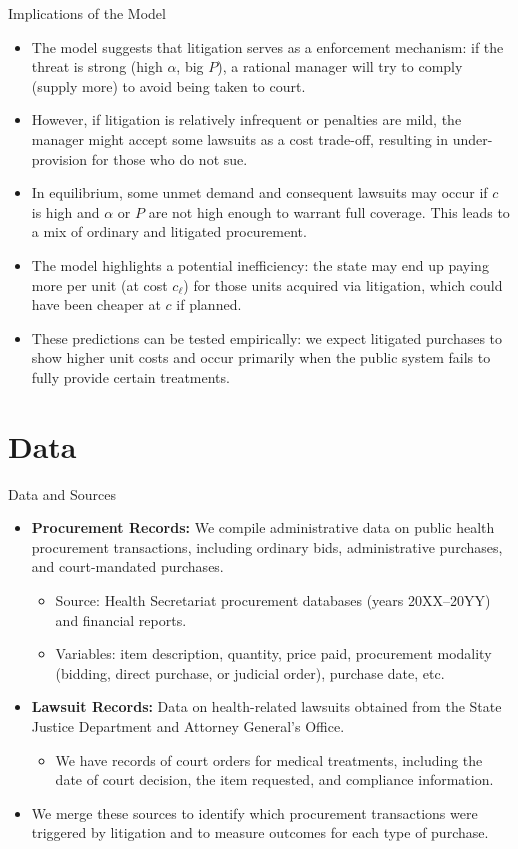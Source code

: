 \documentclass{beamer}
\begin{document}
\begin{frame}{Implications of the Model}
\begin{itemize}
  \item The model suggests that litigation serves as a enforcement mechanism: if the threat is strong (high $\alpha$, big $P$), a rational manager will try to comply (supply more) to avoid being taken to court.
  \item However, if litigation is relatively infrequent or penalties are mild, the manager might accept some lawsuits as a cost trade-off, resulting in under-provision for those who do not sue.
  \item In equilibrium, some unmet demand and consequent lawsuits may occur if $c$ is high and $\alpha$ or $P$ are not high enough to warrant full coverage. This leads to a mix of ordinary and litigated procurement.
  \item The model highlights a potential inefficiency: the state may end up paying more per unit (at cost $c_{\ell}$) for those units acquired via litigation, which could have been cheaper at $c$ if planned.
  \item These predictions can be tested empirically: we expect litigated purchases to show higher unit costs and occur primarily when the public system fails to fully provide certain treatments.
\end{itemize}
\end{frame}

\section{Data}

\begin{frame}{Data and Sources}
\begin{itemize}
  \item \textbf{Procurement Records:} We compile administrative data on public health procurement transactions, including ordinary bids, administrative purchases, and court-mandated purchases. 
  \begin{itemize}
    \item Source: Health Secretariat procurement databases (years 20XX--20YY) and financial reports.
    \item Variables: item description, quantity, price paid, procurement modality (bidding, direct purchase, or judicial order), purchase date, etc.
  \end{itemize}
  \item \textbf{Lawsuit Records:} Data on health-related lawsuits obtained from the State Justice Department and Attorney General’s Office.
  \begin{itemize}
    \item We have records of court orders for medical treatments, including the date of court decision, the item requested, and compliance information.
  \end{itemize}
  \item We merge these sources to identify which procurement transactions were triggered by litigation and to measure outcomes for each type of purchase.
\end{itemize}
\end{frame}
\end{document}

